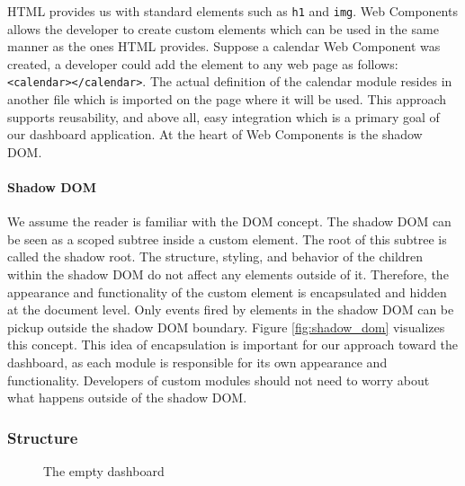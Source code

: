         HTML provides us with standard elements such as \texttt{h1} and \texttt{img}. Web Components allows the developer to create custom elements which can be used in the same manner as the ones HTML provides. Suppose a calendar Web Component was created, a developer could add the element to any web page as follows: \texttt{<calendar></calendar>}. The actual definition of the calendar module resides in another file which is imported on the page where it will be used. This approach supports reusability, and above all, easy integration which is a primary goal of our dashboard application. At the heart of Web Components is the shadow DOM.

        \paragraph{Shadow DOM} We assume the reader is familiar with the DOM concept. The shadow DOM can be seen as a scoped subtree inside a custom element. The root of this subtree is called the shadow root. The structure, styling, and behavior of the children within the shadow DOM do not affect any elements outside of it. Therefore, the appearance and functionality of the custom element is encapsulated and hidden at the document level. Only events fired by elements in the shadow DOM can be pickup outside the shadow DOM boundary. Figure \ref{fig:shadow_dom} visualizes this concept. This idea of encapsulation is important for our approach toward the dashboard, as each module is responsible for its own appearance and functionality. Developers of custom modules should not need to worry about what happens outside of the shadow DOM.

        \subsubsection{Structure}

        \begin{figure}[!t]
            \centering
            \caption{The empty dashboard}\label{fig:screen_db_empty}
        \end{figure}

